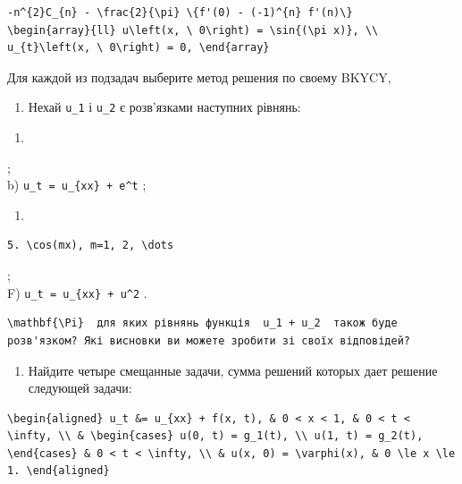 \documentclass[
  ukrainian,
]{article}
\providecommand{\tightlist}{%
  \setlength{\itemsep}{0pt}\setlength{\parskip}{0pt}}
\begin{document}
\begin{verbatim}
-n^{2}C_{n} - \frac{2}{\pi} \{f'(0) - (-1)^{n} f'(n)\}
\begin{array}{ll} u\left(x, \ 0\right) = \sin{(\pi x)}, \\ u_{t}\left(x, \ 0\right) = 0, \end{array}
\end{verbatim}

Для каждой из подзадач выберите метод решения по своему BKYCY,

\begin{enumerate}
\def\labelenumi{\arabic{enumi}.}
\setcounter{enumi}{2}
\tightlist
\item
  Нехай \texttt{u\_1} і \texttt{u\_2} є розв'язками наступних рівнянь:
\end{enumerate}

\begin{enumerate}
\def\labelenumi{\alph{enumi})}
\tightlist
\item
\end{enumerate}

;\\
b) \texttt{u\_t\ =\ u\_\{xx\}\ +\ e\^{}t} ;

\begin{enumerate}
\def\labelenumi{\Alph{enumi})}
\setcounter{enumi}{1}
\tightlist
\item
\end{enumerate}

\begin{verbatim}
5. \cos(mx), m=1, 2, \dots
\end{verbatim}

;\\
F) \texttt{u\_t\ =\ u\_\{xx\}\ +\ u\^{}2} .

\begin{verbatim}
\mathbf{\Pi}  для яких рівнянь функція  u_1 + u_2  також буде розв'язком? Які висновки ви можете зробити зі своїх відповідей?
\end{verbatim}

\begin{enumerate}
\def\labelenumi{\arabic{enumi}.}
\setcounter{enumi}{3}
\tightlist
\item
  Найдите четыре смещанные задачи, сумма решений которых дает решение
  следующей задачи:
\end{enumerate}

\begin{verbatim}
\begin{aligned} u_t &= u_{xx} + f(x, t), & 0 < x < 1, & 0 < t < \infty, \\ & \begin{cases} u(0, t) = g_1(t), \\ u(1, t) = g_2(t), \end{cases} & 0 < t < \infty, \\ & u(x, 0) = \varphi(x), & 0 \le x \le 1. \end{aligned}
\end{verbatim}
\end{document}
